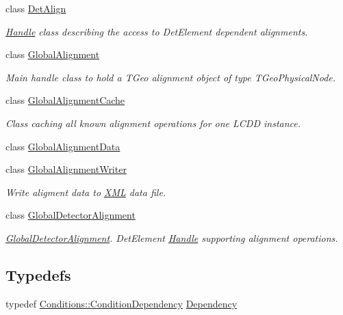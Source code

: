 \begin{DoxyCompactItemize}
class \hyperlink{class_d_d4hep_1_1_alignments_1_1_det_align}{Det\+Align}
\begin{DoxyCompactList}\small\item\em \hyperlink{class_d_d4hep_1_1_handle}{Handle} class describing the access to Det\+Element dependent alignments. \end{DoxyCompactList}\item 
class \hyperlink{class_d_d4hep_1_1_alignments_1_1_global_alignment}{Global\+Alignment}
\begin{DoxyCompactList}\small\item\em Main handle class to hold a T\+Geo alignment object of type T\+Geo\+Physical\+Node. \end{DoxyCompactList}\item 
class \hyperlink{class_d_d4hep_1_1_alignments_1_1_global_alignment_cache}{Global\+Alignment\+Cache}
\begin{DoxyCompactList}\small\item\em Class caching all known alignment operations for one L\+C\+DD instance. \end{DoxyCompactList}\item 
class \hyperlink{class_d_d4hep_1_1_alignments_1_1_global_alignment_data}{Global\+Alignment\+Data}
\item 
class \hyperlink{class_d_d4hep_1_1_alignments_1_1_global_alignment_writer}{Global\+Alignment\+Writer}
\begin{DoxyCompactList}\small\item\em Write aligment data to \hyperlink{namespace_d_d4hep_1_1_x_m_l}{X\+ML} data file. \end{DoxyCompactList}\item 
class \hyperlink{class_d_d4hep_1_1_alignments_1_1_global_detector_alignment}{Global\+Detector\+Alignment}
\begin{DoxyCompactList}\small\item\em \hyperlink{class_d_d4hep_1_1_alignments_1_1_global_detector_alignment}{Global\+Detector\+Alignment}. Det\+Element \hyperlink{class_d_d4hep_1_1_handle}{Handle} supporting alignment operations. \end{DoxyCompactList}\end{DoxyCompactItemize}
\subsection*{Typedefs}
\begin{DoxyCompactItemize}
\item 
typedef \hyperlink{class_d_d4hep_1_1_conditions_1_1_condition_dependency}{Conditions\+::\+Condition\+Dependency} \hyperlink{namespace_d_d4hep_1_1_alignments_a94aaf200a47dbbcf42c8769eb623ea60}{Dependency}
\end{DoxyCompactItemize}


